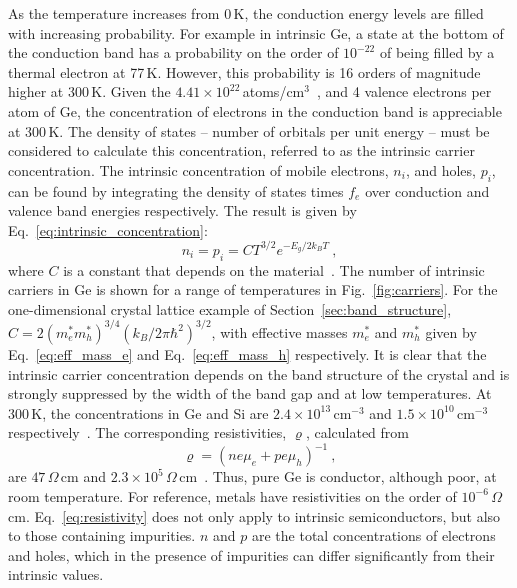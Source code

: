 As the temperature increases from 0\,K, the conduction energy levels are filled with increasing probability. For example in intrinsic Ge, a state at the bottom of the conduction band has a probability on the order of $10^{-22}$ of being filled by a thermal electron at 77\,K. However, this probability is 16 orders of magnitude higher at 300\,K. Given the $4.41\times10^{22}$\,atoms/cm$^3$~\cite{knoll}, and 4 valence electrons per atom of Ge, the concentration of electrons in the conduction band is appreciable at 300\,K. The density of states -- number of orbitals per unit energy -- must be considered to calculate this concentration, referred to as the intrinsic carrier concentration. The intrinsic concentration of mobile electrons, $n_i$, and holes, $p_i$, can be found by integrating the density of states times $f_e$ over conduction and valence band energies respectively. The result is given by Eq.~\ref{eq:intrinsic_concentration}:
\begin{equation}
	n_i = p_i = CT^{3/2}e^{-E_g/2k_BT}~,
	\label{eq:intrinsic_concentration}
\end{equation}
where $C$ is a constant that depends on the material~\cite{knoll, kittel}. The number of intrinsic carriers in Ge is shown for a range of temperatures in Fig.~\ref{fig:carriers}. For the one-dimensional crystal lattice example of Section~\ref{sec:band_structure}, $C = 2(m_e^*m_h^*)^{3/4}(k_B/2\pi\hbar^2)^{3/2}$, with effective masses $m_e^*$ and $m_h^*$ given by Eq.~\ref{eq:eff_mass_e} and Eq.~\ref{eq:eff_mass_h} respectively. It is clear that the intrinsic carrier concentration depends on the band structure of the crystal and is strongly suppressed by the width of the band gap and at low temperatures. At 300\,K, the concentrations in Ge and Si are $2.4\times10^{13}$\,cm$^{-3}$ and $1.5\times10^{10}$\,cm$^{-3}$ respectively~\cite{knoll}. The corresponding resistivities, $\varrho$, calculated from
\begin{equation}
	\varrho = (ne\mu_e + pe\mu_h)^{-1}~,
	\label{eq:resistivity}
\end{equation}
are $47\,\Omega$\,cm and $2.3\times10^{5}\,\Omega$\,cm~\cite{knoll}. Thus, pure Ge is conductor, although poor, at room temperature. For reference, metals have resistivities  on the order of $10^{-6}\,\Omega$\,cm.  Eq.~\ref{eq:resistivity} does not only apply to intrinsic semiconductors, but also to those containing impurities. $n$ and $p$ are the total concentrations of electrons and holes, which in the presence of impurities can differ significantly from their intrinsic values. 

